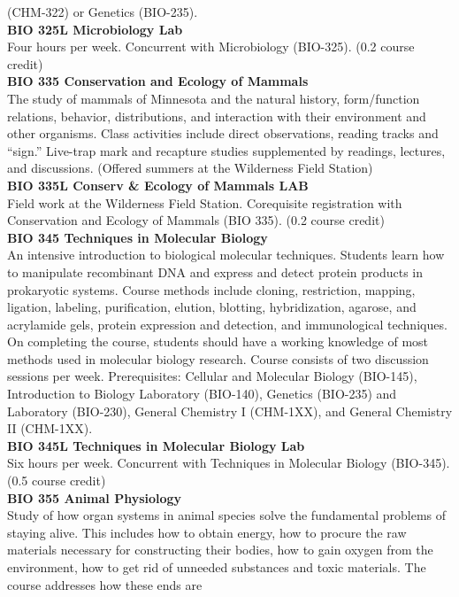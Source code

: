 \documentclass[
  letterpaper,
]{scrbook}
\begin{document}
(CHM-322) or Genetics (BIO-235).\\
\textbf{BIO 325L Microbiology Lab}\\
Four hours per week. Concurrent with Microbiology (BIO-325). (0.2 course
credit)\\
\textbf{BIO 335 Conservation and Ecology of Mammals}\\
The study of mammals of Minnesota and the natural history, form/function
relations, behavior, distributions, and interaction with their
environment and other organisms. Class activities include direct
observations, reading tracks and ``sign.'' Live-trap mark and recapture
studies supplemented by readings, lectures, and discussions. (Offered
summers at the Wilderness Field Station)\\
\textbf{BIO 335L Conserv \& Ecology of Mammals LAB}\\
Field work at the Wilderness Field Station. Corequisite registration
with Conservation and Ecology of Mammals (BIO 335). (0.2 course
credit)\\
\textbf{BIO 345 Techniques in Molecular Biology}\\
An intensive introduction to biological molecular techniques. Students
learn how to manipulate recombinant DNA and express and detect protein
products in prokaryotic systems. Course methods include cloning,
restriction, mapping, ligation, labeling, purification, elution,
blotting, hybridization, agarose, and acrylamide gels, protein
expression and detection, and immunological techniques. On completing
the course, students should have a working knowledge of most methods
used in molecular biology research. Course consists of two discussion
sessions per week. Prerequisites: Cellular and Molecular Biology
(BIO-145), Introduction to Biology Laboratory (BIO-140), Genetics
(BIO-235) and Laboratory (BIO-230), General Chemistry I (CHM-1XX), and
General Chemistry II (CHM-1XX).\\
\textbf{BIO 345L Techniques in Molecular Biology Lab}\\
Six hours per week. Concurrent with Techniques in Molecular Biology
(BIO-345). (0.5 course credit)\\
\textbf{BIO 355 Animal Physiology}\\
Study of how organ systems in animal species solve the fundamental
problems of staying alive. This includes how to obtain energy, how to
procure the raw materials necessary for constructing their bodies, how
to gain oxygen from the environment, how to get rid of unneeded
substances and toxic materials. The course addresses how these ends are
\end{document}
